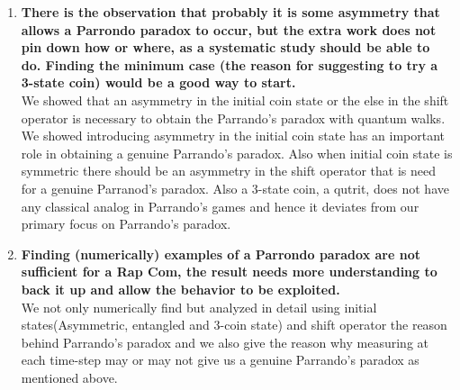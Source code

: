 \documentclass[12pt]{article}
\begin{document}
\begin{enumerate}
\item \textbf{There is the observation that probably it is some asymmetry that
allows a Parrondo paradox to occur, but the extra work does not pin
down how or where, as a systematic study should be able to do. Finding
the minimum case (the reason for suggesting to try a 3-state coin)
would be a good way to start.}\\
We showed that an asymmetry in the initial coin state or the else in the shift operator is necessary to obtain the Parrando's paradox with quantum walks. We showed  introducing asymmetry in the initial coin state has an important role in obtaining a genuine Parrando's paradox. Also when initial coin state is symmetric there should be an asymmetry in the shift operator that is need for a genuine Parranod's paradox. Also a 3-state coin, a qutrit, does not have any classical analog in Parrando's games and hence it deviates from our primary focus on Parrando's paradox.  

\item \textbf{Finding (numerically) examples of a Parrondo paradox are not
sufficient for a Rap Com, the result needs more understanding to back
it up and allow the behavior to be exploited.}\\
We not only numerically find but analyzed in detail using initial states(Asymmetric, entangled and 3-coin state) and shift operator the reason behind Parrando's paradox and we also give the reason why measuring at each time-step may or may not give us a genuine Parrando's paradox as mentioned above. 
\end{enumerate}
\end{document}
